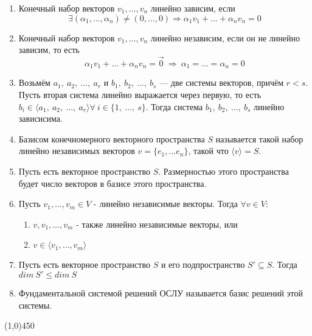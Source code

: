\documentclass[a4paper,12pt]{article}
\newcommand{\al}{\alpha}
\begin{document}
\begin{enumerate}
		\item Конечный набор векторов $v_1, \ldots, v_n$ линейно зависим, если 
		\[
		\exists (\alpha_1, \ldots, \alpha_n) \ne (0, \ldots, 0) \Rightarrow \alpha_1v_1 + \ldots + \alpha_nv_n = 0
		\]
		
		\item Конечный набор векторов $v_1, \ldots, v_n$ линейно независим, если он не линейно зависим, то есть 
		\[
		\al_1v_1 + \ldots + \al_nv_n = \vec{0} \ \Rightarrow \ \al_1 = \ldots = \al_n = 0
		\]
		
		\item Возьмём $a_1,\ a_2,\ \ldots,\ a_r$ и $b_1,\ b_2,\ \ldots,\ b_s$ --- две системы векторов, причём $r < s$. Пусть вторая система линейно выражается через первую, то есть $b_i \in \langle a_1,\ a_2,\ \ldots,\ a_r \rangle \forall\ i \in \{1,\ \ldots ,\ s\}$. Тогда система $b_1,\ b_2,\ \ldots,\ b_s$ линейно зависисима.
		
		\item Базисом конечномерного векторного пространства $S$ называется такой набор линейно независимых векторов $v = \{e_1, \ldots e_n\}$, такой что $\langle v\rangle = S$. 
		
		\item Пусть есть векторное пространство $S$. Размерностью этого пространства будет число векторов в базисе этого пространства.
		
		\item Пусть $v_1, \ldots, v_m \in V$ - линейно независимые векторы. Тогда $\forall v \in V$:
		\begin{enumerate}
			\item $	v, v_1, \ldots, v_m$ - также линейно независимые векторы, или
			\item $ v \in \langle v_1, \ldots, v_m\rangle$
		\end{enumerate}
		
		\item Пусть есть векторное пространство $S$ и его подпространство $S' \subseteq S$. Тогда $dim \ S' \leq dim \ S$
		
		\item Фундаментальной системой решений ОСЛУ называется базис решений этой системы.
	\end{enumerate}

	\begin{center}
		\line(1,0){450}
	\end{center}
		
\end{document}
